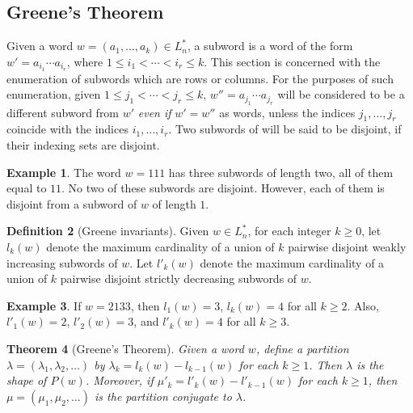 \documentclass[11pt]{amsproc}
\newtheorem{theorem}{Theorem}[subsection]
\theoremstyle{definition}
\newtheorem{definition}[theorem]{Definition}
\theoremstyle{example}
\newtheorem{example}[theorem]{Example}
\begin{document}
\subsection{Greene's Theorem}
\label{sec:greenes-theorem}
Given a word $w = (a_1,\dotsc,a_k)\in L_n^*$, a subword is a word of the form $w' = a_{i_1}\dotsb a_{i_r}$, where $1\leq i_1<\dotsb < i_r\leq k$.
This section is concerned with the enumeration of subwords which are rows or columns.
For the purposes of such enumeration, given $1 \leq j_1<\dotsb <j_r\leq k$, $w'' = a_{j_1}\dotsb a_{j_r}$ will be considered to be a different subword from $w'$ \emph{even if} $w'=w''$ as words, unless the indices $j_1,\dotsc, j_r$ coincide with the indices $i_1,\dotsc,i_r$.
Two subwords of will be said to be disjoint, if their indexing sets are disjoint.
\begin{example}
  The word $w=111$ has three subwords of length two, all of them equal to $11$.
  No two of these subwords are disjoint.
  However, each of them is disjoint from a subword of $w$ of length $1$.
\end{example}
\begin{definition}
  [Greene invariants]
  \label{definition:Greene-invars}
  Given $w \in L_n^*$, for each integer $k\geq 0$, let $l_k(w)$ denote the maximum cardinality of a union of $k$ pairwise disjoint weakly increasing subwords of $w$.
  Let $l'_k(w)$ denote the maximum cardinality of a union of $k$ pairwise disjoint strictly decreasing subwords of $w$.
\end{definition}
\begin{example}
  If $w=2133$, then $l_1(w)=3$, $l_k(w)=4$ for all $k\geq 2$.
  Also, $l'_1(w) = 2$, $l'_2(w)=3$, and $l'_k(w)=4$ for all $k\geq 3$.
\end{example}
\begin{theorem}
  [Greene's Theorem]
  \label{theorem:Greene}
  Given a word $w$, define a partition $\lambda=(\lambda_1,\lambda_2,\dotsc)$ by $\lambda_k=l_k(w)-l_{k-1}(w)$ for each $k\geq 1$.
  Then $\lambda$ is the shape of $P(w)$.
  Moreover, if $\mu'_k=l'_k(w)-l'_{k-1}(w)$ for each $k\geq 1$, then $\mu=(\mu_1,\mu_2,\dotsc)$ is the partition conjugate to $\lambda$.
\end{theorem}
\end{document}
